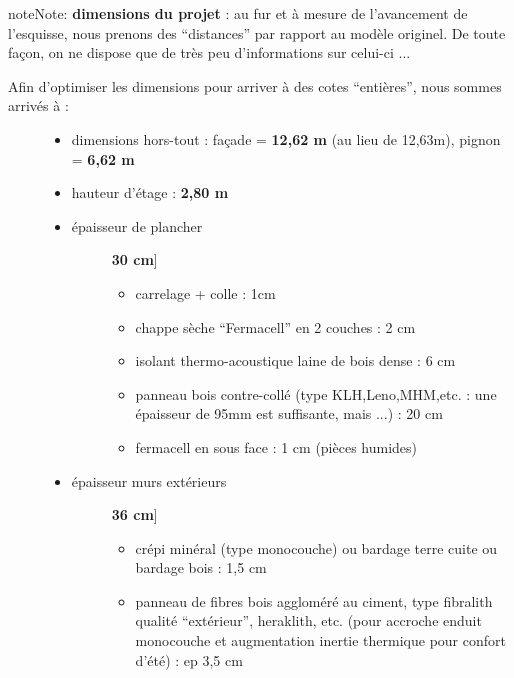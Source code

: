 \documentclass[a4paper,12pt,french]{sphinxmanual}
\begin{document}
\begin{notice}{note}{Note:}
\textbf{dimensions du projet} : au fur et à mesure de l'avancement de l'esquisse, nous prenons des ``distances'' par rapport au modèle originel. De toute façon, on ne dispose que de très peu                 d'informations sur celui-ci ...
\begin{description}
\item[{Afin d'optimiser les dimensions pour arriver à des cotes ``entières'', nous sommes arrivés à :}] \leavevmode\begin{itemize}
\item {} 
dimensions hors-tout : façade = \textbf{12,62 m} (au lieu de 12,63m), pignon = \textbf{6,62 m}

\item {} 
hauteur d'étage : \textbf{2,80 m}

\item {} \begin{description}
\item[{épaisseur de plancher}] \leavevmode{[}\textbf{30 cm}{]}\begin{itemize}
\item {} 
carrelage + colle : 1cm

\item {} 
chappe sèche ``Fermacell'' en 2 couches : 2 cm

\item {} 
isolant thermo-acoustique laine de bois dense : 6 cm

\item {} 
panneau bois contre-collé (type KLH,Leno,MHM,etc. : une épaisseur de 95mm est suffisante, mais ...) : 20 cm

\item {} 
fermacell en sous face : 1 cm (pièces humides)

\end{itemize}

\end{description}

\item {} \begin{description}
\item[{épaisseur murs extérieurs}] \leavevmode{[}\textbf{36 cm}{]}\begin{itemize}
\item {} 
crépi minéral (type monocouche) ou bardage terre cuite ou bardage bois : 1,5 cm

\item {} 
panneau de fibres bois aggloméré au ciment, type fibralith qualité ``extérieur'', heraklith, etc. (pour accroche enduit monocouche et augmentation inertie thermique pour confort d'été)  : ep 3,5 cm


\end{itemize}
\end{description}
\end{itemize}
\end{description}
\end{notice}
\end{document}
